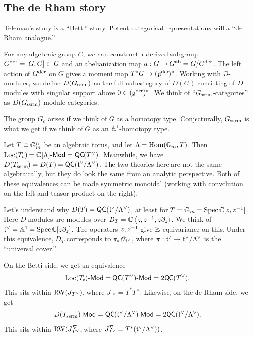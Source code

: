 \documentclass{article}
\begin{document}
\subsection{The de Rham story}

Teleman's story is a ``Betti'' story.
Potent categorical representations will a ``de Rham analogue.''

For any algebraic group $G$, we can construct a derived subgroup $G^\der = [G, G] \subset G$ and an abelianization map $a: G \to G^\ab = G / G^\der$.
The left action of $G^\der$ on $G$ gives a moment map $T^* G \to (\gfr^\der)^*$.
Working with $D$-modules, we define $D(G_\ssrm)$ as the full subcategory of $D(G)$ consisting of $D$-modules with singular support above $0 \in (\gfr^\der)^*$.
We think of ``$G_\ssrm$-categories'' as $D(G_\ssrm)$-module categories.

\begin{rmk}
  The group $G_c$ arises if we think of $G$ as a homotopy type.
  Conjecturally, $G_\ssrm$ is what we get if we think of $G$ as an $\AA^1$-homotopy type.
\end{rmk}

\begin{ex}
  Let $T \cong \GG_m^n$ be an algebraic torus, and let $\Lambda = \Hom(\GG_m, T)$.
  Then $\Loc(T_c) = \CC[\Lambda]\dMod = \QC(T^\vee)$.
  Meanwhile, we have $D(T_\ssrm) = D(T) = \QC(\tfr^\vee / \Lambda^\vee)$.
  The two theories here are not the same algebraically, but they do look the same from an analytic perspective.
  Both of these equivalences can be made symmetric monoidal (working with convolution on the left and tensor product on the right).

  Let's understand why $D(T) = \QC(\tfr^\vee / \Lambda^\vee)$, at least for $T = \GG_m = \Spec \CC[z, z\inv]$.
  Here $D$-modules are modules over $D_T = \CC\angles{z, z\inv, z\partial_z}$.
  We think of $\tfr^\vee = \AA^1 = \Spec \CC[z \partial_z]$.
  The operators $z, z\inv$ give $\ZZ$-equivariance on this.
  Under this equivalence, $D_T$ corresponds to $\pi_* \Osc_{\tfr^\vee}$, where $\pi: \tfr^\vee \to \tfr^\vee / \Lambda^\vee$ is the ``universal cover.''

  On the Betti side, we get an equivalence 
  \[
    \Loc(T_c)\dMod = \QC(T^\vee)\dMod = 2\QC(T^\vee).
  \]
  This sits within $\RW(J_{T^\vee})$, where $J_{T^\vee} = T^* T^\vee$.
  Likewise, on the de Rham side, we get 
  \[
    D(T_\ssrm)\dMod = \QC(\tfr^\vee / \Lambda^\vee)\dMod = 2\QC(\tfr^\vee / \Lambda^\vee).
  \]
  This sits within $\RW(J_{T^\vee}^\nabla$, where $J_{T^\vee}^\nabla = T^*(\tfr^\vee / \Lambda^\vee))$.
\end{ex}
\end{document}
